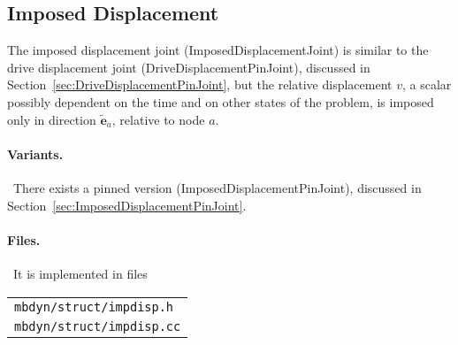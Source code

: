 \documentclass[10pt,dvips,fleqn,subeqn]{report}
\newcommand{\T}[1]{\boldsymbol{#1}}
\begin{document}
\subsection{Imposed Displacement}
\label{sec:ImposedDisplacementJoint}
The imposed displacement joint (ImposedDisplacementJoint) 
is similar to the drive displacement joint (DriveDisplacementPinJoint),
discussed in Section~\ref{sec:DriveDisplacementPinJoint},
but the relative displacement $v$, a scalar possibly dependent on the time
and on other states of the problem, is imposed only in direction 
$\tilde{\T{e}}_a$, relative to node $a$.

\paragraph{Variants.} \
There exists a pinned version (ImposedDisplacementPinJoint),
discussed in Section~\ref{sec:ImposedDisplacementPinJoint}.

\paragraph{Files.} \
It is implemented in files

\begin{tabular}{l}
\texttt{mbdyn/struct/impdisp.h} \\
\texttt{mbdyn/struct/impdisp.cc}
\end{tabular}
\end{document}
